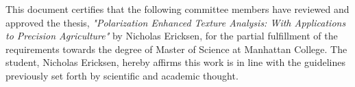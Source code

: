 
\begin{center}
  \begin{minipage}{0.80\textwidth}
        This document certifies that the following committee members have reviewed and approved the thesis, \textit{"Polarization Enhanced Texture Analysis: With Applications to Precision Agriculture"} by Nicholas Ericksen,
        for the partial fulfillment of the requirements towards the degree of Master of Science at Manhattan College. The student, Nicholas Ericksen, hereby affirms this work is in line with the guidelines previously set forth by scientific and academic thought. \\
        \linebreak
        \noindent {}
        \linebreak
        \noindent {}
        \linebreak
        \noindent {}
        \linebreak
        \noindent {}
  \end{minipage}


\end{center}
